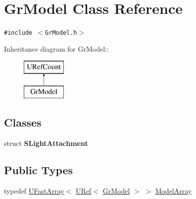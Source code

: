 \hypertarget{class_gr_model}{
\section{GrModel Class Reference}
\label{class_gr_model}
}
{\tt \#include $<$GrModel.h$>$}

Inheritance diagram for GrModel::\begin{figure}[H]
\begin{center}
\leavevmode
\includegraphics[height=2cm]{class_gr_model}
\end{center}
\end{figure}
\subsection*{Classes}
\begin{CompactItemize}
\item 
struct \textbf{SLightAttachment}
\end{CompactItemize}
\subsection*{Public Types}
\begin{CompactItemize}
\item 
typedef \hyperlink{class_u_fast_array}{UFastArray}$<$ \hyperlink{class_u_ref}{URef}$<$ \hyperlink{class_gr_model}{GrModel} $>$ $>$ \hyperlink{class_gr_model_1bc87aacfe8601c9096280a5257679cd}{ModelArray}
\end{CompactItemize}
